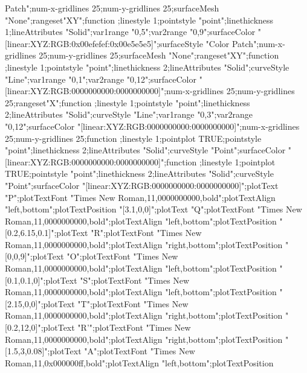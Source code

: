 \documentclass{article}
\begin{document}
{{Patch";num-x-gridlines 25;num-y-gridlines 25;surfaceMesh
"None";rangeset"XY";function ;linestyle
1;pointstyle "point";linethickness 1;lineAttributes "Solid";var1range
"0,5";var2range "0,9";surfaceColor
"[linear:XYZ:RGB:0x00efefef:0x00e5e5e5]";surfaceStyle "Color
Patch";num-x-gridlines 25;num-y-gridlines 25;surfaceMesh
"None";rangeset"XY";function ;linestyle
1;pointstyle "point";linethickness 2;lineAttributes "Solid";curveStyle
"Line";var1range "0,1";var2range "0,12";surfaceColor
"[linear:XYZ:RGB:0000000000:0000000000]";num-x-gridlines 25;num-y-gridlines
25;rangeset"X";function ;linestyle 1;pointstyle
"point";linethickness 2;lineAttributes "Solid";curveStyle "Line";var1range
"0,3";var2range "0,12";surfaceColor
"[linear:XYZ:RGB:0000000000:0000000000]";num-x-gridlines 25;num-y-gridlines
25;function ;linestyle 1;pointplot TRUE;pointstyle
"point";linethickness 2;lineAttributes "Solid";curveStyle
"Point";surfaceColor "[linear:XYZ:RGB:0000000000:0000000000]";function
;linestyle 1;pointplot TRUE;pointstyle
"point";linethickness 2;lineAttributes "Solid";curveStyle
"Point";surfaceColor "[linear:XYZ:RGB:0000000000:0000000000]";plotText
"P";plotTextFont "Times New Roman,11,0000000000,bold";plotTextAlign
"left,bottom";plotTextPosition "[3.1,0,0]";plotText "Q";plotTextFont "Times
New Roman,11,0000000000,bold";plotTextAlign "left,bottom";plotTextPosition
"[0.2,6.15,0.1]";plotText "R";plotTextFont "Times New
Roman,11,0000000000,bold";plotTextAlign "right,bottom";plotTextPosition
"[0,0,9]";plotText "O";plotTextFont "Times New
Roman,11,0000000000,bold";plotTextAlign "left,bottom";plotTextPosition
"[0.1,0.1,0]";plotText "S";plotTextFont "Times New
Roman,11,0000000000,bold";plotTextAlign "left,bottom";plotTextPosition
"[2.15,0,0]";plotText "T";plotTextFont "Times New
Roman,11,0000000000,bold";plotTextAlign "right,bottom";plotTextPosition
"[0.2,12,0]";plotText "R'";plotTextFont "Times New
Roman,11,0000000000,bold";plotTextAlign "right,bottom";plotTextPosition
"[1.5,3,0.08]";plotText "A";plotTextFont "Times New
Roman,11,0x000000ff,bold";plotTextAlign "left,bottom";plotTextPosition
}}
\end{document}
